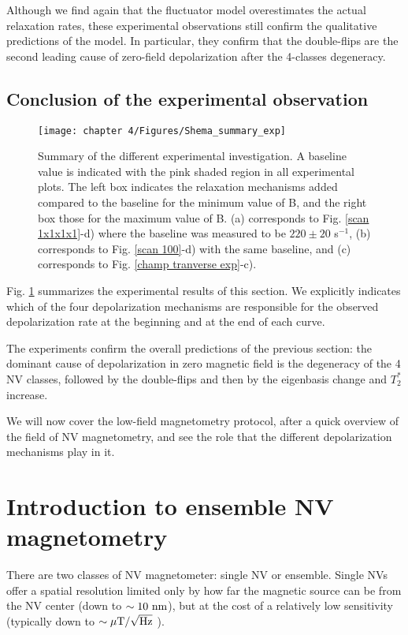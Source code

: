 \documentclass[a4paper, 11pt]{report}
\begin{document}
Although we find again that the fluctuator model overestimates the actual relaxation rates, these experimental observations still confirm the qualitative predictions of the model. In particular, they confirm that the double-flips are the second leading cause of zero-field depolarization after the 4-classes degeneracy.

\subsection{Conclusion of the experimental observation}

\begin{figure}[h!]
\centering
\texttt{[image: chapter 4/Figures/Shema\_summary\_exp]}
\caption{Summary of the different experimental investigation. A baseline value is indicated with the pink shaded region in all experimental plots. The left box indicates the relaxation mechanisms added compared to the baseline for the minimum value of B, and the right box those for the maximum value of B. (a) corresponds to Fig. \ref{scan 1x1x1x1}-d) where the baseline was measured to be $220\pm 20$ s$^{-1}$, (b) corresponds to Fig. \ref{scan 100}-d) with the same baseline, and (c) corresponds to Fig. \ref{champ tranverse exp}-c).}
\label{summary_exp}
\end{figure}

Fig. \ref{summary_exp} summarizes the experimental results of this section. We explicitly indicates which of the four depolarization mechanisms are responsible for the observed depolarization rate at the beginning and at the end of each curve.

The experiments confirm the overall predictions of the previous section: the dominant cause of depolarization in zero magnetic field is the degeneracy of the 4 NV classes, followed by the double-flips and then by the eigenbasis change and $T_2^*$ increase.

We will now cover the low-field magnetometry protocol, after a quick overview of the field of NV magnetometry, and see the role that the different depolarization mechanisms play in it.


\section{Introduction to ensemble NV magnetometry}
\label{sec 4.4}

There are two classes of NV magnetometer: single NV or ensemble. Single NVs offer a spatial resolution limited only by how far the magnetic source can be from the NV center (down to $\sim 10\ \rm nm$), but at the cost of a relatively low sensitivity (typically down to $\sim \mu \rm{T} / \sqrt{\rm Hz}$ \citep{pelliccione2016scanned}).
\end{document}
